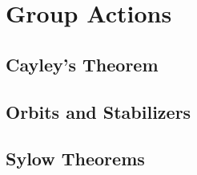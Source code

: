 \chapter{Group Actions}
\section{Cayley's Theorem}
\section{Orbits and Stabilizers}
\section{Sylow Theorems}